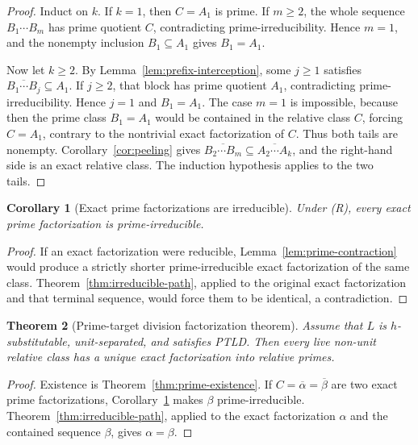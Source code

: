 \documentclass[11pt,a4paper]{article}
\newtheorem{theorem}{Theorem}[section]
\newtheorem{corollary}[theorem]{Corollary}
\begin{document}
\begin{proof}
Induct on $k$.  If $k=1$, then $C=A_1$ is prime.  If $m\ge2$, the
whole sequence $B_1\cdots B_m$ has prime quotient $C$, contradicting
prime-irreducibility.  Hence $m=1$, and the nonempty inclusion
$B_1\subseteq A_1$ gives $B_1=A_1$.

Now let $k\ge2$.  By Lemma~\ref{lem:prefix-interception}, some $j\ge1$
satisfies $\overline{B_1\cdots B_j}\subseteq A_1$.  If $j\ge2$, that
block has prime quotient $A_1$, contradicting prime-irreducibility.
Hence $j=1$ and $B_1=A_1$.  The case $m=1$ is impossible, because then
the prime class $B_1=A_1$ would be contained in the relative class
$C$, forcing $C=A_1$, contrary to the nontrivial exact factorization of
$C$.  Thus both tails are nonempty.  Corollary~\ref{cor:peeling} gives
\(\overline{B_2\cdots B_m}\subseteq\overline{A_2\cdots A_k}\), and
the right-hand side is an exact relative class.  The induction
hypothesis applies to the two tails.
\end{proof}

\begin{corollary}[Exact prime factorizations are irreducible]
\label{cor:exact-irreducible}
Under \textup{(R)}, every exact prime factorization is
prime-irreducible.
\end{corollary}

\begin{proof}
If an exact factorization were reducible, Lemma~\ref{lem:prime-contraction} would produce a strictly shorter prime-irreducible exact factorization of the same class.  Theorem~\ref{thm:irreducible-path}, applied to the original exact factorization and that terminal sequence, would force them to be identical, a contradiction.
\end{proof}

\begin{theorem}[Prime-target division factorization theorem]
\label{thm:ptld-uf}
Assume that $L$ is $h$-substitutable, unit-separated, and satisfies
PTLD.  Then every live non-unit relative class has a unique exact
factorization into relative primes.
\end{theorem}

\begin{proof}
Existence is Theorem~\ref{thm:prime-existence}.  If
$C=\overline\alpha=\overline\beta$ are two exact prime factorizations,
Corollary~\ref{cor:exact-irreducible} makes $\beta$ prime-irreducible.
Theorem~\ref{thm:irreducible-path}, applied to the exact factorization
$\alpha$ and the contained sequence $\beta$, gives $\alpha=\beta$.
\end{proof}
\end{document}
